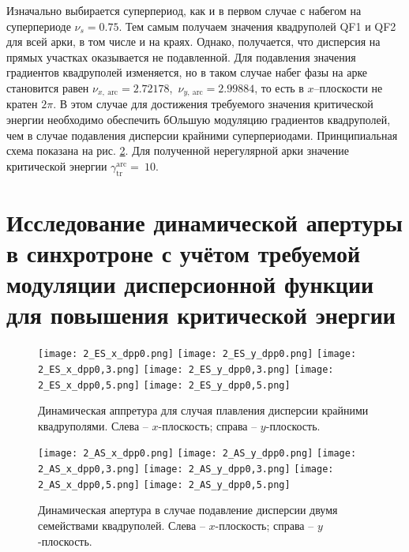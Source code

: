 \par Изначально выбирается суперпериод, как и в первом случае с набегом на суперпериоде $\nu_s=0.75$. Тем самым получаем значения квадруполей QF1 и QF2 для всей арки, в том числе и на краях. Однако, получается, что дисперсия на прямых участках оказывается не подавленной. Для подавления значения градиентов квадруполей изменяется, но в таком случае набег фазы на арке становится равен $\nu_{x,\ \text{arc}}=2.72178$,\ $\nu_{y,\ \text{arc}}=2.99884$, то есть в $x$–плоскости не кратен $2\pi$. В этом случае для достижения требуемого значения критической энергии необходимо обеспечить бОльшую модуляцию градиентов квадруполей, чем в случае подавления дисперсии крайними суперпериодами. Принципиальная схема показана на рис. \ref{fig:DA_AS_dpp}. Для полученной нерегулярной арки значение критической энергии $\gamma_{\text{tr}}^{\text{arc}}=\ 10$.

\section{Исследование динамической апертуры в синхротроне с учётом требуемой модуляции дисперсионной функции для повышения критической энергии}

\begin{figure} [h!]
	\center
	\texttt{[image: 2\_ES\_x\_dpp0.png]}
	\texttt{[image: 2\_ES\_y\_dpp0.png]}
	\texttt{[image: 2\_ES\_x\_dpp0,3.png]}
	\texttt{[image: 2\_ES\_y\_dpp0,3.png]}
	\texttt{[image: 2\_ES\_x\_dpp0,5.png]}
	\texttt{[image: 2\_ES\_y\_dpp0,5.png]}
	\caption{Динамическая аппретура для случая плавления дисперсии крайними квадруполями. 
		Слева – $x$-плоскость; справа – $y$-плоскость.}
	\label{fig:DA_ES_dpp}
\end{figure}	

\begin{figure} [h!]
   \center
   \texttt{[image: 2\_AS\_x\_dpp0.png]}
   \texttt{[image: 2\_AS\_y\_dpp0.png]}
   \texttt{[image: 2\_AS\_x\_dpp0,3.png]}
   \texttt{[image: 2\_AS\_y\_dpp0,3.png]}
   \texttt{[image: 2\_AS\_x\_dpp0,5.png]}
   \texttt{[image: 2\_AS\_y\_dpp0,5.png]}
   \caption{Динамическая апертура в случае подавление дисперсии двумя семействами квадруполей.
Слева – $x$-плоскость; справа – $y$-плоскость.}
   \label{fig:DA_AS_dpp}
\end{figure}

